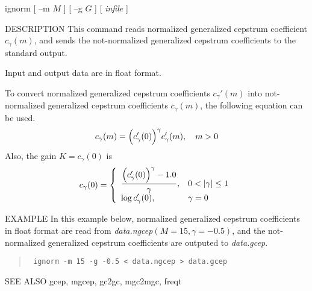 \begin{synopsis}
\item [ignorm] [ --m $M$ ] [ --g $G$ ] [ {\em infile} ]
\end{synopsis}

\begin{qsection}{DESCRIPTION}
This command reads normalized generalized cepstrum coefficient
 $c_\gamma(m)$, and sends the not-normalized generalized
cepstrum coefficients to the standard output.
\par
Input and output data are in float format.
\par
To convert normalized generalized cepstrum coefficients
$c_\gamma'(m)$ into not-normalized generalized cepstrum coefficients
$c_\gamma(m)$, the following equation can be used.
\begin{displaymath}
c_\gamma(m) = \Bigl(c_\gamma'(0)\Bigr)^{\gamma} c_\gamma'(m), ~~~m>0
\end{displaymath}
Also, the gain $K = c_\gamma(0)$ is
\begin{displaymath}
c_\gamma(0) = \left\{
	\begin{array}{ll} \displaystyle
	  \frac{\Bigl(c_\gamma'(0)\Bigr)^{\gamma} - 1.0}{\gamma},
		& 0<|\gamma|\leq 1 \\ \displaystyle
	  \log c_\gamma'(0),  & \gamma=0
	\end{array} \right.
\end{displaymath}
\end{qsection}

\begin{options}
\end{options}

\begin{qsection}{EXAMPLE}
In this example below,
normalized generalized cepstrum coefficients in
float format are read from {\em data.ngcep}$(M=15, \gamma=-0.5)$,
and the not-normalized generalized cepstrum coefficients
are outputed to {\em data.gcep}.
\begin{quote}
 \verb! ignorm -m 15 -g -0.5 < data.ngcep > data.gcep!
\end{quote} 
\end{qsection}

\begin{qsection}{SEE ALSO}
 gcep, mgcep, gc2gc, mgc2mgc, freqt
\end{qsection}
